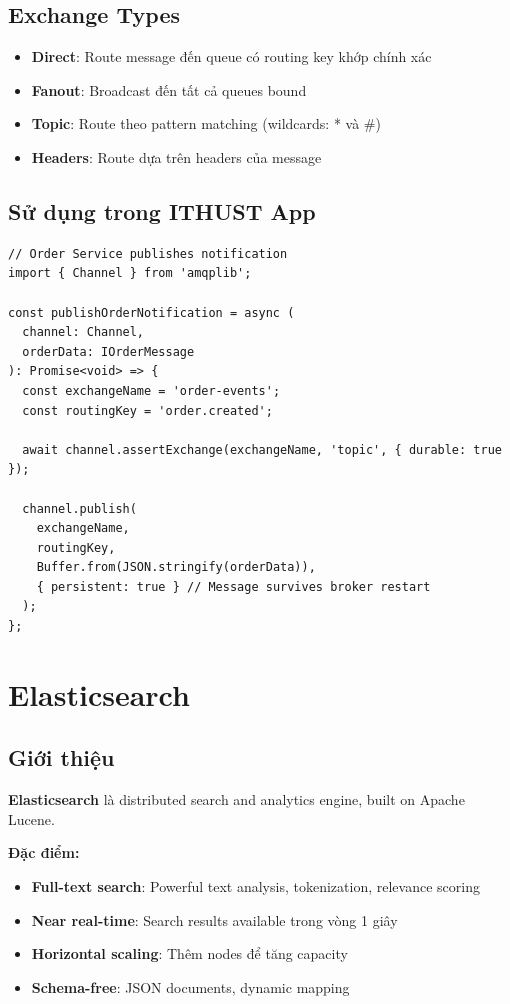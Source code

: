 \documentclass[12pt]{extreport}
\begin{document}
\subsection{Exchange Types}

\begin{itemize}
    \item \textbf{Direct}: Route message đến queue có routing key khớp chính xác
    \item \textbf{Fanout}: Broadcast đến tất cả queues bound
    \item \textbf{Topic}: Route theo pattern matching (wildcards: * và #)
    \item \textbf{Headers}: Route dựa trên headers của message
\end{itemize}

\subsection{Sử dụng trong ITHUST App}

\begin{lstlisting}[style=TypeScriptStyle, caption={RabbitMQ Message Publishing}]
// Order Service publishes notification
import { Channel } from 'amqplib';

const publishOrderNotification = async (
  channel: Channel,
  orderData: IOrderMessage
): Promise<void> => {
  const exchangeName = 'order-events';
  const routingKey = 'order.created';
  
  await channel.assertExchange(exchangeName, 'topic', { durable: true });
  
  channel.publish(
    exchangeName,
    routingKey,
    Buffer.from(JSON.stringify(orderData)),
    { persistent: true } // Message survives broker restart
  );
};
\end{lstlisting}

\section{Elasticsearch}

\subsection{Giới thiệu}

\textbf{Elasticsearch} là distributed search and analytics engine, built on Apache Lucene.

\textbf{Đặc điểm:}
\begin{itemize}
    \item \textbf{Full-text search}: Powerful text analysis, tokenization, relevance scoring
    \item \textbf{Near real-time}: Search results available trong vòng 1 giây
    \item \textbf{Horizontal scaling}: Thêm nodes để tăng capacity
    \item \textbf{Schema-free}: JSON documents, dynamic mapping
\end{itemize}
\end{document}
